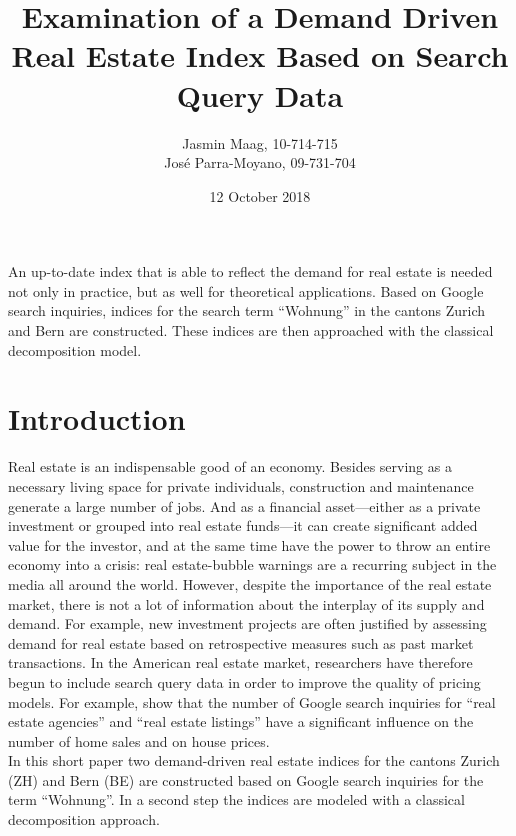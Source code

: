 \documentclass[11pt]{article}
\title{\textbf{Examination of a Demand Driven Real Estate Index Based on Search Query Data}}
\author{Jasmin Maag, 10-714-715\\
	Jos\'e Parra-Moyano, 09-731-704}
\date{12 October 2018}
\renewenvironment{abstract}
{\list{}{\rightmargin\leftmargin}%
	\item[\textbf{\hspace{10mm}Abstract.}]\relax}
{\endlist}
\begin{document}
\maketitle

\begin{abstract}
	An up-to-date index that is able to reflect the demand for real estate is needed not only in practice, but as well for theoretical applications. Based on Google search inquiries, indices for the search term ``Wohnung'' in the cantons Zurich and Bern are constructed. These indices are then approached with the classical decomposition model.
\end{abstract}

\section*{Introduction}
Real estate is an indispensable good of an economy. Besides serving as a necessary living space for private individuals, construction and maintenance generate a large number of jobs. And as a financial asset---either as a private investment or grouped into real estate funds---it can create significant added value for the investor, and at the same time have the power to throw an entire economy into a crisis: real estate-bubble warnings are a recurring subject in the media all around the world. However, despite the importance of the real estate market, there is not a lot of information about the interplay of its supply and demand. For example, new investment projects are often justified by assessing demand for real estate based on retrospective measures such as past market transactions.
In the American real estate market, researchers have therefore begun to include search query data in order to improve the quality of pricing models. For example, \cite{wubrynjolffsson} show that the number of Google search inquiries for ``real estate agencies'' and ``real estate listings'' have a significant influence on the number of home sales and on house prices.
 \\
 In this short paper two demand-driven real estate indices for the cantons Zurich (ZH) and Bern (BE) are constructed based on Google search inquiries for the term ``Wohnung''. In a second step the indices are modeled with a classical decomposition approach.
\end{document}
